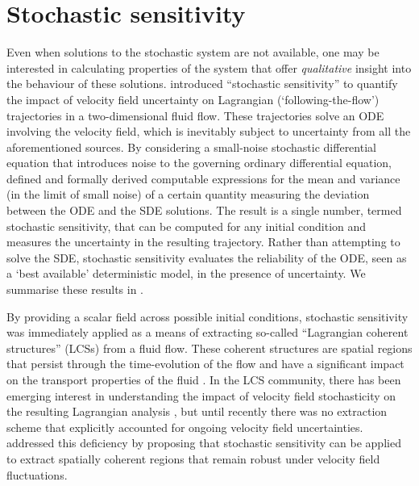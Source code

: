 \section{Stochastic sensitivity}
Even when solutions to the stochastic system are not available, one may be interested in calculating properties of the system that offer \emph{qualitative} insight into the behaviour of these solutions.
\citet{Balasuriya_2020_StochasticSensitivityComputable} introduced ``stochastic sensitivity'' to quantify the impact of velocity field uncertainty on Lagrangian (`following-the-flow') trajectories in a two-dimensional fluid flow.
These trajectories solve an ODE involving the velocity field, which is inevitably subject to uncertainty from all the aforementioned sources.
By considering a small-noise stochastic differential equation that introduces noise to the governing ordinary differential equation, \citet{Balasuriya_2020_StochasticSensitivityComputable} defined and formally derived computable expressions for the mean and variance (in the limit of small noise) of a certain quantity measuring the deviation between the ODE and the SDE solutions.
The result is a single number, termed stochastic sensitivity, that can be computed for any initial condition and measures the uncertainty in the resulting trajectory.
Rather than attempting to solve the SDE, stochastic sensitivity evaluates the reliability of the ODE, seen as a `best available' deterministic model, in the presence of uncertainty.
We summarise these results in .

By providing a scalar field across possible initial conditions, stochastic sensitivity was immediately applied as a means of extracting so-called ``Lagrangian coherent structures'' (LCSs) from a fluid flow.
These coherent structures are spatial regions that persist through the time-evolution of the flow and have a significant impact on the transport properties of the fluid \citep{BalasuriyaEtAl_2018_GeneralizedLagrangianCoherent,HadjighasemEtAl_2017_CriticalComparisonLagrangian,PeacockDabiri_2010_IntroductionFocusIssue}.
In the LCS community, there has been emerging interest in understanding the impact of velocity field stochasticity on the resulting Lagrangian analysis \citep{DennerEtAl_2016_ComputingCoherentSets,YouLeung_2021_ComputingFiniteTime,Balasuriya_2020_StochasticApproachesLagrangian,HallerEtAl_2018_MaterialBarriersDiffusive,BalasuriyaGottwald_2018_EstimatingStableUnstable,Balasuriya_2017_StochasticUncertaintyAdvected}, but until recently there was no extraction scheme that explicitly accounted for ongoing velocity field uncertainties.
\citet{Balasuriya_2020_StochasticSensitivityComputable} addressed this deficiency by proposing that stochastic sensitivity can be applied to extract spatially coherent regions that remain robust under velocity field fluctuations.

